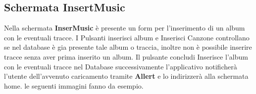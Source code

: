 \documentclass[11pt]{article}
\begin{document}
	\clearpage
	\subsection{Schermata InsertMusic}

	Nella schermata \textbf{InserMusic} è presente un form per l'inserimento di un album con le eventuali tracce. I Pulsanti inserisci album e Inserisci Canzone controllano se nel database
	è gia presente tale album o traccia, inoltre non è possibile inserire tracce senza aver prima inserito un album. Il pulsante concludi Inserisce l'album con le eventuali tracce nel Database
	successivamente l'applicativo notificherà l'utente dell'avvenuto caricamento tramite \textbf{Allert} e lo indirizzerà alla schermata home. le seguenti immagini fanno da esempio.
	\begin{figure}[h]
		\centering
	\end{figure}
\end{document}
